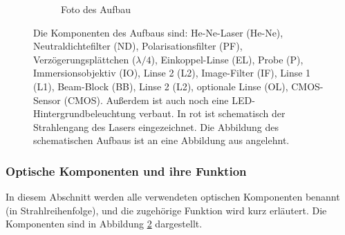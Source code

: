 \documentclass[titlepage,  ngerman]{article}
\begin{document}
\begin{figure}[h]
\begin{subfigure}{0.9\textwidth}
			\caption{Foto des Aufbau}
			\label{fig:aufsicht_aufbau_anotated}
		\end{subfigure}
		\caption[Versuchsaufbau]{Die Komponenten des Aufbaus sind: He-Ne-Laser (He-Ne), Neutraldichtefilter (ND), Polarisationsfilter (PF), Verzögerungsplättchen ($\lambda/4$), Einkoppel-Linse (EL), Probe (P), Immersionsobjektiv (IO), Linse 2 (L2), Image-Filter (IF), Linse 1 (L1), Beam-Block (BB), Linse 2 (L2), optionale Linse (OL), CMOS-Sensor (CMOS). Außerdem ist auch noch eine LED-Hintergrundbeleuchtung verbaut. In rot ist schematisch der Strahlengang des Lasers eingezeichnet. Die Abbildung des schematischen Aufbaus ist an eine Abbildung aus \cite{Jaruschewski.2020} angelehnt.}
		\label{fig:Aufbau}
	\end{figure}
	\subsubsection{Optische Komponenten und ihre Funktion}
		In diesem Abschnitt werden alle verwendeten optischen Komponenten benannt (in Strahlreihenfolge), und die zugehörige Funktion wird kurz erläutert. Die Komponenten sind in Abbildung \ref{fig:Aufbau} dargestellt.
\end{document}
